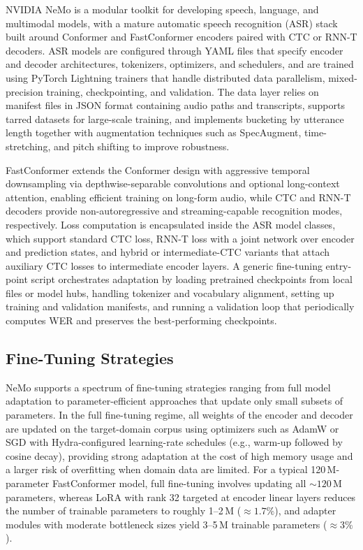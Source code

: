 \documentclass[conference]{IEEEtran}
\begin{document}
NVIDIA NeMo is a modular toolkit for developing speech, language, and multimodal models, with a mature automatic speech recognition (ASR) stack built around Conformer and FastConformer encoders paired with CTC or RNN-T decoders.
ASR models are configured through YAML files that specify encoder and decoder architectures, tokenizers, optimizers, and schedulers, and are trained using PyTorch Lightning trainers that handle distributed data parallelism, mixed-precision training, checkpointing, and validation.
The data layer relies on manifest files in JSON format containing audio paths and transcripts, supports tarred datasets for large-scale training, and implements bucketing by utterance length together with augmentation techniques such as SpecAugment, time-stretching, and pitch shifting to improve robustness.

FastConformer extends the Conformer design with aggressive temporal downsampling via depthwise-separable convolutions and optional long-context attention, enabling efficient training on long-form audio, while CTC and RNN-T decoders provide non-autoregressive and streaming-capable recognition modes, respectively.
Loss computation is encapsulated inside the ASR model classes, which support standard CTC loss, RNN-T loss with a joint network over encoder and prediction states, and hybrid or intermediate-CTC variants that attach auxiliary CTC losses to intermediate encoder layers.
A generic fine-tuning entry-point script orchestrates adaptation by loading pretrained checkpoints from local files or model hubs, handling tokenizer and vocabulary alignment, setting up training and validation manifests, and running a validation loop that periodically computes WER and preserves the best-performing checkpoints.

\subsection{Fine-Tuning Strategies}

NeMo supports a spectrum of fine-tuning strategies ranging from full model adaptation to parameter-efficient approaches that update only small subsets of parameters.
In the full fine-tuning regime, all weights of the encoder and decoder are updated on the target-domain corpus using optimizers such as AdamW or SGD with Hydra-configured learning-rate schedules (e.g., warm-up followed by cosine decay), providing strong adaptation at the cost of high memory usage and a larger risk of overfitting when domain data are limited.
For a typical 120\,M-parameter FastConformer model, full fine-tuning involves updating all \(\sim 120\,\text{M}\) parameters, whereas LoRA with rank 32 targeted at encoder linear layers reduces the number of trainable parameters to roughly 1--2\,M (\(\approx 1.7\%\)), and adapter modules with moderate bottleneck sizes yield 3--5\,M trainable parameters (\(\approx 3\%\)).
\end{document}
